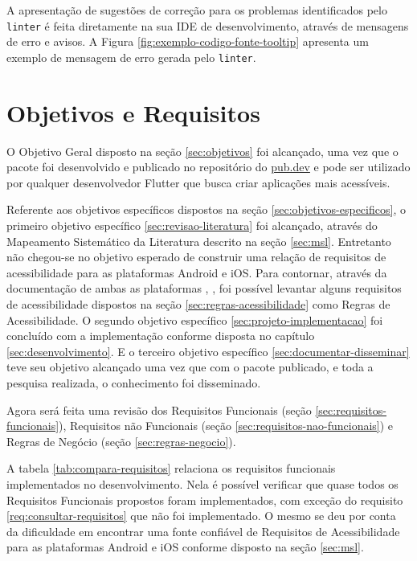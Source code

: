 A apresentação de sugestões de correção para os problemas identificados pelo \texttt{linter} é feita diretamente na sua IDE de desenvolvimento, através de mensagens de erro e avisos. A Figura \ref{fig:exemplo-codigo-fonte-tooltip} apresenta um exemplo de mensagem de erro gerada pelo \texttt{linter}.

\section{Objetivos e Requisitos}

O Objetivo Geral disposto na seção \ref{sec:objetivos} foi alcançado, uma vez que o pacote  foi desenvolvido e publicado no repositório do \href{https://pub.dev/packages/accessibility_lint}{pub.dev} e pode ser utilizado por qualquer desenvolvedor Flutter que busca criar aplicações mais acessíveis.

Referente aos objetivos específicos dispostos na seção \ref{sec:objetivos-especificos}, o primeiro objetivo específico \ref{sec:revisao-literatura} foi alcançado, através do Mapeamento Sistemático da Literatura descrito na seção \ref{sec:msl}. Entretanto não chegou-se no objetivo esperado de construir uma relação de requisitos de acessibilidade para as plataformas Android e iOS. Para contornar, através da documentação de ambas as plataformas \cite{iosaccessibility}, \cite{androidaccessibility}, foi possível levantar alguns requisitos de acessibilidade dispostos na seção \ref{sec:regras-acessibilidade} como Regras de Acessibilidade. O segundo objetivo específico \ref{sec:projeto-implementacao} foi concluído com a implementação conforme disposta no capítulo \ref{sec:desenvolvimento}. E o terceiro objetivo específico \ref{sec:documentar-disseminar} teve seu objetivo alcançado uma vez que com o pacote publicado, e toda a pesquisa realizada, o conhecimento foi disseminado.

Agora será feita uma revisão dos Requisitos Funcionais (seção \ref{sec:requisitos-funcionais}), Requisitos não Funcionais (seção \ref{sec:requisitos-nao-funcionais}) e Regras de Negócio (seção \ref{sec:regras-negocio}).

A tabela \ref{tab:compara-requisitos} relaciona os requisitos funcionais implementados no desenvolvimento. Nela é possível verificar que quase todos os Requisitos Funcionais propostos foram implementados, com exceção do requisito \ref{req:consultar-requisitos} que não foi implementado. O mesmo se deu por conta da dificuldade em encontrar uma fonte confiável de Requisitos de Acessibilidade para as plataformas Android e iOS conforme disposto na seção \ref{sec:msl}.

